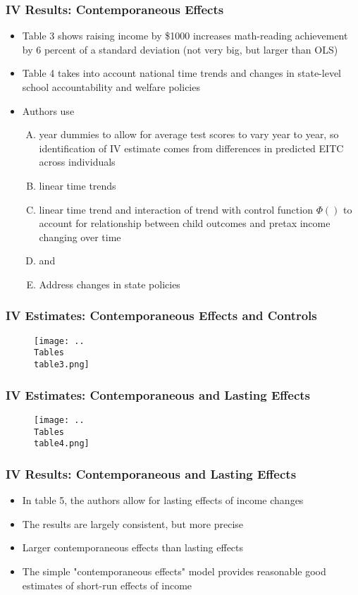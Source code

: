 \documentclass{beamer}
\begin{document}
\begin{frame}
\frametitle{IV Results: Contemporaneous Effects}
\begin{itemize}
	\item Table 3 shows raising income by \$1000 increases math-reading achievement by 6 percent of a standard deviation (not very big, but larger than OLS)
	\item Table 4 takes into account national time trends and changes in state-level school accountability and welfare policies
	\item Authors use 
	\begin{enumerate}[A.]
		\item year dummies to allow for average test scores to vary year to year, so identification of IV estimate comes from differences in predicted EITC across individuals
		\item linear time trends
		\item linear time trend and interaction of trend with control function $\Phi()$ to account for relationship between child outcomes and pretax income changing over time
		\item  and 
		\item Address changes in state policies
	\end{enumerate} 
\end{itemize}
\end{frame}

\begin{frame}
\frametitle{IV Estimates: Contemporaneous Effects and Controls}
\begin{figure}
	\texttt{[image: ..\\Tables\\table3.png]} %
\end{figure}
\end{frame}

\begin{frame}
\frametitle{IV Estimates: Contemporaneous and Lasting Effects}
\begin{figure}
	\texttt{[image: ..\\Tables\\table4.png]} %
\end{figure}
\end{frame}

\begin{frame}
\frametitle{IV Results: Contemporaneous and Lasting Effects}
\begin{itemize}
	\item In table 5, the authors allow for lasting effects of income changes
	\item The results are largely consistent, but more precise
	\item Larger contemporaneous effects than lasting effects
	\item The simple "contemporaneous effects" model provides reasonable good estimates of short-run effects of income
\end{itemize}
\end{frame}
\end{document}
